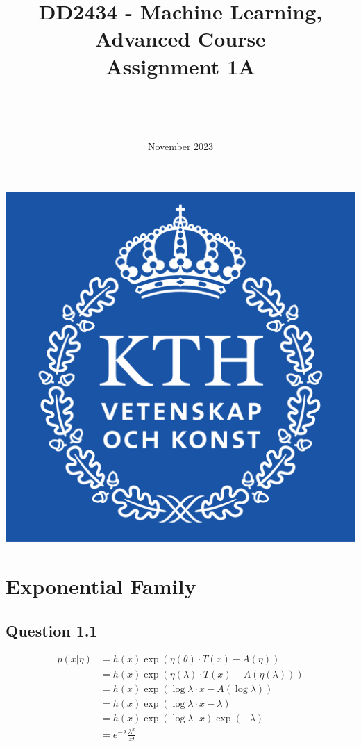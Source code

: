 \documentclass{article}
\title{DD2434 - Machine Learning, Advanced Course \\ Assignment 1A}
\author{\authorFst \\ \emailFst \and \authorSnd \\ \emailSnd}
\date{November 2023}
\begin{document}
\maketitle

\begin{center}
    \includegraphics{KTH_Logotyp_RGB_2013.png}
\end{center}

\newpage

\section{Exponential Family}

\subsection{Question 1.1}

\begin{equation}
    \begin{split}
        p(x|\eta) & = h(x) \exp(\eta(\theta) \cdot T(x) - A(\eta))           \\
                  & = h(x) \exp(\eta(\lambda) \cdot T(x) - A(\eta(\lambda))) \\
                  & = h(x) \exp(\log \lambda \cdot x - A(\log \lambda))      \\
                  & = h(x) \exp(\log \lambda \cdot x - \lambda)              \\
                  & = h(x) \exp(\log \lambda \cdot x) \exp(-\lambda)         \\
                  & = e^{-\lambda} \frac{\lambda^x}{x!}
    \end{split}
\end{equation}
\end{document}
